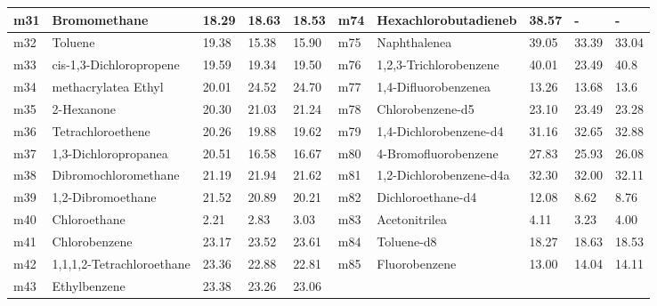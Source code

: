 \documentclass[11pt]{article}
\begin{document}
\begin{table}
\begin{tabular}{|l|l|l|l|l|l|l|l|l|l|}
\hline
m31 & Bromomethane & 18.29 & 18.63 & 18.53 & m74 & Hexachlorobutadieneb & 38.57 & - & - \\
\hline
m32 & Toluene & 19.38 & 15.38 & 15.90 & m75 & Naphthalenea & 39.05 & 33.39 & 33.04 \\
\hline
m33 & cis-1,3-Dichloropropene & 19.59 & 19.34 & 19.50 & m76 & 1,2,3-Trichlorobenzene & 40.01 & 23.49 & 40.8 \\
\hline
m34 & methacrylatea Ethyl & 20.01 & 24.52 & 24.70 & m77 & 1,4-Difluorobenzenea & 13.26 & 13.68 & 13.6 \\
\hline
m35 & 2-Hexanone & 20.30 & 21.03 & 21.24 & m78 & Chlorobenzene-d5 & 23.10 & 23.49 & 23.28 \\
\hline
m36 & Tetrachloroethene & 20.26 & 19.88 & 19.62 & m79 & 1,4-Dichlorobenzene-d4 & 31.16 & 32.65 & 32.88 \\
\hline
m37 & 1,3-Dichloropropanea & 20.51 & 16.58 & 16.67 & m80 & 4-Bromofluorobenzene & 27.83 & 25.93 & 26.08 \\
\hline
m38 & Dibromochloromethane & 21.19 & 21.94 & 21.62 & m81 & 1,2-Dichlorobenzene-d4a & 32.30 & 32.00 & 32.11 \\
\hline
m39 & 1,2-Dibromoethane & 21.52 & 20.89 & 20.21 & m82 & Dichloroethane-d4 & 12.08 & 8.62 & 8.76 \\
\hline
m40 & Chloroethane & 2.21 & 2.83 & 3.03 & m83 & Acetonitrilea & 4.11 & 3.23 & 4.00 \\
\hline
m41 & Chlorobenzene & 23.17 & 23.52 & 23.61 & m84 & Toluene-d8 & 18.27 & 18.63 & 18.53 \\
\hline
m42 & 1,1,1,2-Tetrachloroethane & 23.36 & 22.88 & 22.81 & m85 & Fluorobenzene & 13.00 & 14.04 & 14.11 \\
\hline
m43 & Ethylbenzene & 23.38 & 23.26 & 23.06 \\
\hline
\end{tabular}
\end{table}
\end{document}
